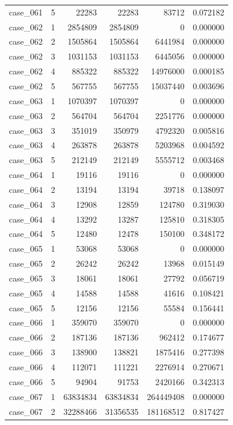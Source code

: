 \begin{longtable}{lrrrrr}
case\_061 & 5 & 22283 & 22283 & 83712 & 0.072182 \\
case\_062 & 1 & 2854809 & 2854809 & 0 & 0.000000 \\
case\_062 & 2 & 1505864 & 1505864 & 6441984 & 0.000000 \\
case\_062 & 3 & 1031153 & 1031153 & 6445056 & 0.000000 \\
case\_062 & 4 & 885322 & 885322 & 14976000 & 0.000185 \\
case\_062 & 5 & 567755 & 567755 & 15037440 & 0.003696 \\
case\_063 & 1 & 1070397 & 1070397 & 0 & 0.000000 \\
case\_063 & 2 & 564704 & 564704 & 2251776 & 0.000000 \\
case\_063 & 3 & 351019 & 350979 & 4792320 & 0.005816 \\
case\_063 & 4 & 263878 & 263878 & 5203968 & 0.004592 \\
case\_063 & 5 & 212149 & 212149 & 5555712 & 0.003468 \\
case\_064 & 1 & 19116 & 19116 & 0 & 0.000000 \\
case\_064 & 2 & 13194 & 13194 & 39718 & 0.138097 \\
case\_064 & 3 & 12908 & 12859 & 124780 & 0.319030 \\
case\_064 & 4 & 13292 & 13287 & 125810 & 0.318305 \\
case\_064 & 5 & 12480 & 12478 & 150100 & 0.348172 \\
case\_065 & 1 & 53068 & 53068 & 0 & 0.000000 \\
case\_065 & 2 & 26242 & 26242 & 13968 & 0.015149 \\
case\_065 & 3 & 18061 & 18061 & 27792 & 0.056719 \\
case\_065 & 4 & 14588 & 14588 & 41616 & 0.108421 \\
case\_065 & 5 & 12156 & 12156 & 55584 & 0.156441 \\
case\_066 & 1 & 359070 & 359070 & 0 & 0.000000 \\
case\_066 & 2 & 187136 & 187136 & 962412 & 0.174677 \\
case\_066 & 3 & 138900 & 138821 & 1875416 & 0.277398 \\
case\_066 & 4 & 112071 & 111221 & 2276914 & 0.270671 \\
case\_066 & 5 & 94904 & 91753 & 2420166 & 0.342313 \\
case\_067 & 1 & 63834834 & 63834834 & 264449408 & 0.000000 \\
case\_067 & 2 & 32288466 & 31356535 & 181168512 & 0.817427 \\

\end{longtable}
